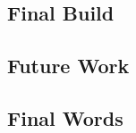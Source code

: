 \documentclass{article}
\begin{document}
\subsection{Final Build}

\subsection{Future Work}

\subsection{Final Words}


\clearpage



\end{document}
